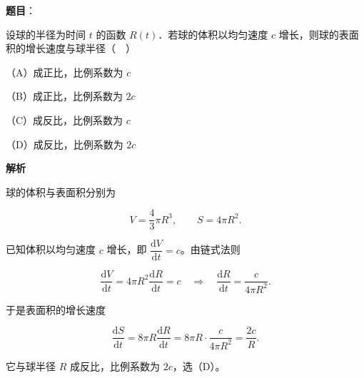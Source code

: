 \begin{answer}

\textbf{题目}：

设球的半径为时间 $t$ 的函数 $R(t)$．若球的体积以均匀速度 $c$ 增长，则球的表面积的增长速度与球半径（　）

（A）成正比，比例系数为 $c$

（B）成正比，比例系数为 $2c$

（C）成反比，比例系数为 $c$

（D）成反比，比例系数为 $2c$

\textbf{解析}

球的体积与表面积分别为

\nopagebreak[4]
\[V=\frac43\pi R^3,\qquad S=4\pi R^2.\]

已知体积以均匀速度 $c$ 增长，即 $\dfrac{\mathrm dV}{\mathrm dt}=c$。由链式法则

\nopagebreak[4]
\[\frac{\mathrm dV}{\mathrm dt}=4\pi R^2\frac{\mathrm dR}{\mathrm dt}=c\quad\Longrightarrow\quad\frac{\mathrm dR}{\mathrm dt}=\frac{c}{4\pi R^2}.\]

于是表面积的增长速度

\nopagebreak[4]
\[\frac{\mathrm dS}{\mathrm dt}=8\pi R\frac{\mathrm dR}{\mathrm dt}=8\pi R\cdot\frac{c}{4\pi R^2}=\frac{2c}{R}.\]

它与球半径 $R$ 成反比，比例系数为 $2c$，选（D）。


\end{answer}
